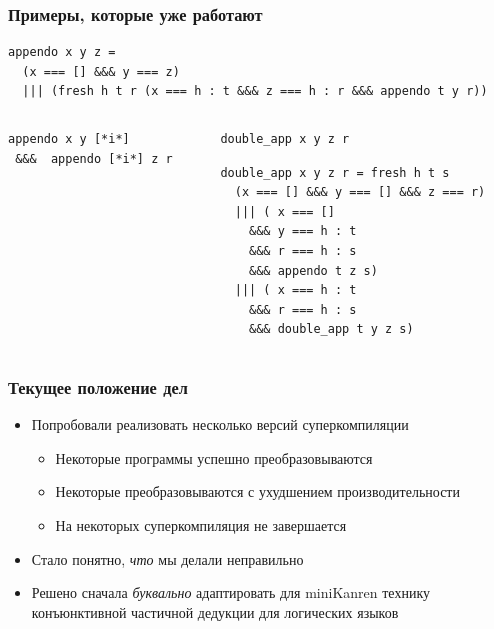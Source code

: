 \documentclass{beamer}
\begin{document}
\begin{frame}[fragile,t]
  \transwipe[direction=90]
  \frametitle{Примеры, которые уже работают}
\begin{center}
\begin{minipage}[c]{9.5cm}
\begin{lstlisting}[frame=single]  
appendo x y z = 
  (x === [] &&& y === z)
  ||| (fresh h t r (x === h : t &&& z === h : r &&& appendo t y r))
\end{lstlisting}
\end{minipage}
\end{center}

\vspace{-0.5cm}

\begin{columns}[t]
\begin{column}{4cm}
\begin{badcode}
\begin{lstlisting}[frame=single]  
appendo x y [*i*] 
 &&&  appendo [*i*] z r
\end{lstlisting}
\end{badcode}
\end{column}

\pause

\begin{column}{6cm}
\begin{goodcode}
\begin{lstlisting}[frame=single]  
double_app x y z r
\end{lstlisting}

\begin{lstlisting}[frame=single]  
double_app x y z r = fresh h t s 
  (x === [] &&& y === [] &&& z === r)
  ||| ( x === [] 
    &&& y === h : t 
    &&& r === h : s 
    &&& appendo t z s)
  ||| ( x === h : t 
    &&& r === h : s 
    &&& double_app t y z s)
\end{lstlisting}
\end{goodcode}
\end{column}
\end{columns}
\end{frame}

\begin{frame}[fragile]
  \transwipe[direction=90]
  \frametitle{Текущее положение дел}
\begin{itemize}
  \item Попробовали реализовать несколько версий суперкомпиляции
  \begin{itemize}
    \item Некоторые программы успешно преобразовываются
    \item Некоторые преобразовываются с ухудшением производительности
    \item На некоторых суперкомпиляция не завершается
  \end{itemize}
  \item Стало понятно, \emph{что} мы делали неправильно
  \item Решено сначала \emph{буквально} адаптировать для miniKanren технику конъюнктивной частичной дедукции для логических языков
\end{itemize}
\end{frame}
\end{document}
